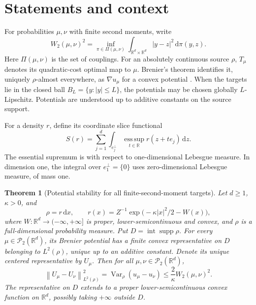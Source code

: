 \documentclass[11pt]{article}
\numberwithin{equation}{section}
\newtheorem{theorem}{Theorem}[section]
\theoremstyle{remark}
\newcommand{\R}{\mathbb R}
\newcommand{\Prob}{\mathcal P}
\newcommand{\Var}{\operatorname{Var}}
\newcommand{\supp}{\operatorname{supp}}
\newcommand{\esssup}{\operatorname*{ess\,sup}}
\newcommand{\dd}{\,\mathrm d}
\newcommand{\interior}{\operatorname{int}}
\newcommand{\norm}[1]{\left\lVert #1\right\rVert}
\begin{document}
\section{Statements and context}\label{sec:intro}
For probabilities $\mu,\nu$ with finite second moments, write
\[
 W_2(\mu,\nu)^2=\inf_{\pi\in\Pi(\mu,\nu)}
 \int_{\R^d\times\R^d}|y-z|^2\dd\pi(y,z).
\]
Here $\Pi(\mu,\nu)$ is the set of couplings. For an absolutely continuous source $\rho$, $T_\mu$ denotes its quadratic-cost optimal map to $\mu$. Brenier's theorem identifies it, uniquely $\rho$-almost everywhere, as $\nabla u_\mu$ for a convex potential \cite{Brenier1991}. When the targets lie in the closed ball $B_L=\{y:|y|\le L\}$, the potentials may be chosen globally $L$-Lipschitz. Potentials are understood up to additive constants on the source support.

For a density $r$, define its coordinate slice functional
\begin{equation}\label{eq:slice-functional}
 S(r)=\sum_{j=1}^d\int_{e_j^\perp}
       \esssup_{t\in\R} r(z+t e_j)\dd z.
\end{equation}
The essential supremum is with respect to one-dimensional Lebesgue measure. In dimension one, the integral over $e_1^\perp=\{0\}$ uses zero-dimensional Lebesgue measure, of mass one.

\begin{theorem}[Potential stability for all finite-second-moment targets]\label{thm:strong}
Let $d\ge1$, $\kappa>0$, and
\begin{equation}\label{eq:strong-density}
 \rho=r\dd x,\qquad
 r(x)=Z^{-1}\exp\bigl(-\kappa|x|^2/2-W(x)\bigr),
\end{equation}
where $W:\R^d\to(-\infty,+\infty]$ is proper, lower-semicontinuous and convex, and $\rho$ is a full-dimensional probability measure. Put $D=\interior\supp\rho$. For every $\mu\in\Prob_2(\R^d)$, its Brenier potential has a finite convex representative on $D$ belonging to $L^2(\rho)$, unique up to an additive constant. Denote its unique centered representative by $U_\mu$. Then for all $\mu,\nu\in\Prob_2(\R^d)$,
\begin{equation}\label{eq:main-potential}
 \norm{U_\mu-U_\nu}_{L^2(\rho)}^2
 =\Var_\rho(u_\mu-u_\nu)
 \le \frac{2}{\kappa}W_2(\mu,\nu)^2.
\end{equation}
The representative on $D$ extends to a proper lower-semicontinuous convex function on $\R^d$, possibly taking $+\infty$ outside $D$.
\end{theorem}
\end{document}
